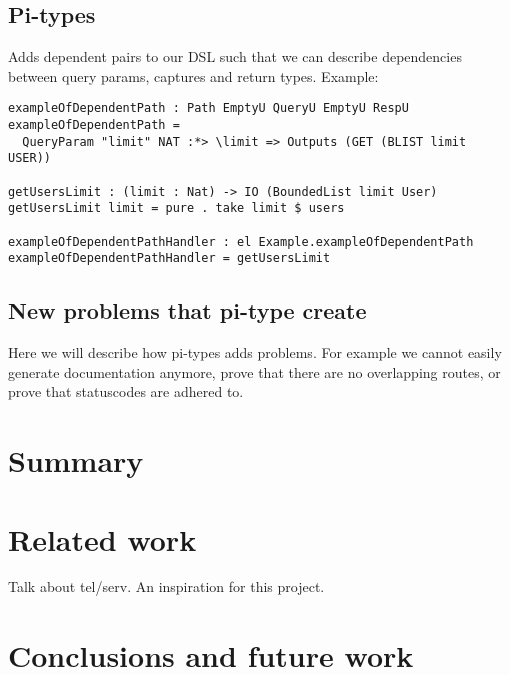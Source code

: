 \documentclass[12pt,a4paper]{article}
\begin{document}
\subsection{Pi-types}
Adds dependent pairs to our DSL such that we can describe dependencies between query params, captures and return types.  Example:

\begin{verbatim}
exampleOfDependentPath : Path EmptyU QueryU EmptyU RespU
exampleOfDependentPath =
  QueryParam "limit" NAT :*> \limit => Outputs (GET (BLIST limit USER))

getUsersLimit : (limit : Nat) -> IO (BoundedList limit User)
getUsersLimit limit = pure . take limit $ users

exampleOfDependentPathHandler : el Example.exampleOfDependentPath
exampleOfDependentPathHandler = getUsersLimit

\end{verbatim}
\subsection{New problems that pi-type create}
Here we will describe how pi-types adds problems. For example we cannot easily generate documentation anymore, prove that there are no overlapping routes, or prove that statuscodes are adhered to.

\section{Summary}
\section{Related work}
Talk about tel/serv. An inspiration for this project.
\section{Conclusions and future work}
\end{document}
